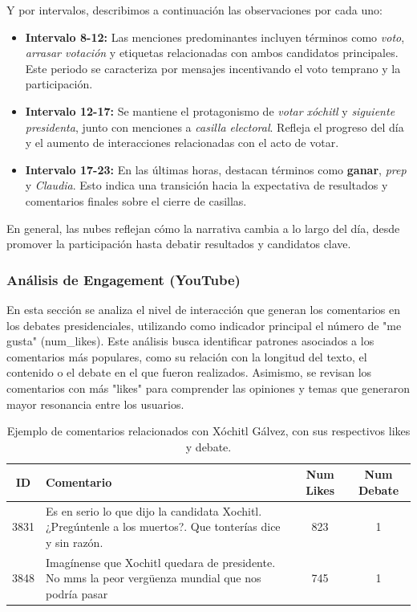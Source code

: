 \documentclass[10pt, a4paper]{article}
\begin{document}
	Y por intervalos, describimos a continuación las observaciones por cada uno:
	
	\begin{itemize}
		\item \textbf{Intervalo 8-12:} Las menciones predominantes incluyen términos como \textit{voto}, \textit{arrasar votación} y etiquetas relacionadas con ambos candidatos principales. Este periodo se caracteriza por mensajes incentivando el voto temprano y la participación.
		
		\item \textbf{Intervalo 12-17:} Se mantiene el protagonismo de \textit{votar xóchitl} y \textit{siguiente presidenta}, junto con menciones a \textit{casilla electoral}. Refleja el progreso del día y el aumento de interacciones relacionadas con el acto de votar.
		
		\item \textbf{Intervalo 17-23:} En las últimas horas, destacan términos como \textbf{ganar}, \textit{prep} y \textit{Claudia}. Esto indica una transición hacia la expectativa de resultados y comentarios finales sobre el cierre de casillas.
	\end{itemize}
	En general, las nubes reflejan cómo la narrativa cambia a lo largo del día, desde promover la participación hasta debatir resultados y candidatos clave.
	
	
	\subsubsection{Análisis de Engagement (YouTube)}
	
	En esta sección se analiza el nivel de interacción que generan los comentarios en los debates presidenciales, utilizando como indicador principal el número de "me gusta" (num\_likes). Este análisis busca identificar patrones asociados a los comentarios más populares, como su relación con la longitud del texto, el contenido o el debate en el que fueron realizados. Asimismo, se revisan los comentarios con más "likes" para comprender las opiniones y temas que generaron mayor resonancia entre los usuarios.
	
	\begin{table}[H]
		\centering
		\begin{tabular}{|c|p{11cm}|c|c|}
			\hline
			\textbf{ID} & \textbf{Comentario} & \textbf{Num Likes} & \textbf{Num Debate} \\ \hline
			3831 & Es en serio lo que dijo la candidata Xochitl. ¿Pregúntenle a los muertos?. Que tonterías dice y sin razón. & 823 & 1 \\ \hline
			3848 & Imagínense que Xochitl quedara de presidente. No mms la peor vergüenza mundial que nos podría pasar & 745 & 1 \\ \hline
		\end{tabular}
		\caption{Ejemplo de comentarios relacionados con Xóchitl Gálvez, con sus respectivos likes y debate.}
		\label{tab:comentarios_xochitl}
	\end{table}
	
\end{document}
